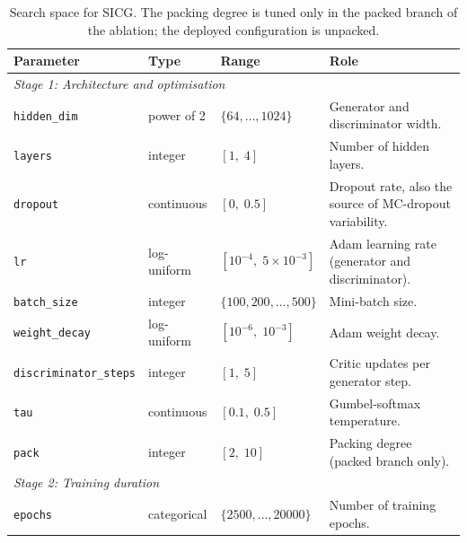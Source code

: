 \begin{table}[ht]
\centering
\caption{Search space for SICG. The packing degree is tuned only in the packed branch of the ablation; the deployed configuration is unpacked.}
\label{tab:tune_sicg}
\begin{tabularx}{\textwidth}{lll>{\raggedright\arraybackslash}X}
\toprule
Parameter & Type & Range & Role \\
\midrule
\multicolumn{4}{l}{\textit{Stage 1: Architecture and optimisation}} \\
\texttt{hidden\_dim} & power of 2 & $\{64, \ldots, 1024\}$ &
    Generator and discriminator width. \\
\texttt{layers} & integer & $[1,\; 4]$ &
    Number of hidden layers. \\
\texttt{dropout} & continuous & $[0,\; 0.5]$ &
    Dropout rate, also the source of MC-dropout variability. \\
\texttt{lr} & log-uniform & $[10^{-4},\; 5 \times 10^{-3}]$ &
    Adam learning rate (generator and discriminator). \\
\texttt{batch\_size} & integer & $\{100, 200, \ldots, 500\}$ &
    Mini-batch size. \\
\texttt{weight\_decay} & log-uniform & $[10^{-6},\; 10^{-3}]$ &
    Adam weight decay. \\
\texttt{discriminator\_steps} & integer & $[1,\; 5]$ &
    Critic updates per generator step. \\
\texttt{tau} & continuous & $[0.1,\; 0.5]$ &
    Gumbel-softmax temperature. \\
\texttt{pack} & integer & $[2,\; 10]$ &
    Packing degree (packed branch only). \\
\midrule
\multicolumn{4}{l}{\textit{Stage 2: Training duration}} \\
\texttt{epochs} & categorical & $\{2500, \ldots, 20000\}$ &
    Number of training epochs. \\
\bottomrule
\end{tabularx}
\end{table}

